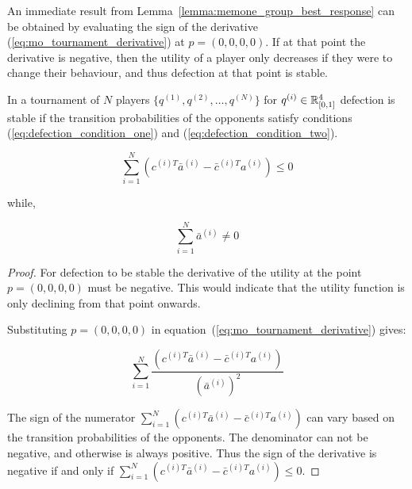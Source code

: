 An immediate result from Lemma~\ref{lemma:memone_group_best_response} can be
obtained by evaluating the sign of the derivative
(\ref{eq:mo_tournament_derivative}) at \(p=(0, 0, 0, 0)\). If at that point the
derivative is negative, then the utility of a player only decreases if they were
to change their behaviour, and thus defection at that point is stable.

\begin{lemma}\label{lemma:stability_of_defection}
    In a tournament of \(N\) players \(\{q^{(1)}, q^{(2)}, \dots, q^{(N)} \}\)
    for \(q^{(i)} \in \mathbb{R}_{[0, 1]} ^ 4\)
    defection is stable if the transition probabilities of the
    opponents satisfy conditions (\ref{eq:defection_condition_one}) and (\ref{eq:defection_condition_two}).

    \begin{equation}\label{eq:defection_condition_one}
        \sum_{i=1} ^ N (c^{(i)T} \bar{a}^{(i)} - \bar{c}^{(i)T} a^{(i)}) \leq 0
    \end{equation}

    while,

    \begin{equation}\label{eq:defection_condition_two}
        \sum_{i=1} ^ N \bar{a}^{(i)} \neq 0
    \end{equation}
\end{lemma}

\begin{proof}
    For defection to be stable the derivative of the utility
    at the point \(p = (0, 0, 0, 0)\) must be negative. This would indicate that
    the utility function is only declining from that point onwards.

    Substituting \(p = (0, 0, 0, 0)\) in
    equation~(\ref{eq:mo_tournament_derivative}) gives:

    \begin{equation}
    \sum_{i=1} ^ N \frac{(c^{(i)T} \bar{a}^{(i)} - \bar{c}^{(i)T} a^{(i)})}
    {(\bar{a}^{(i)})^2}
    \end{equation}

    The sign of the numerator \( \displaystyle\sum_{i=1} ^ N (c^{(i)T} \bar{a}^{(i)} - \bar{c}^{(i)T} a^{(i)})\)
    can vary based on the transition probabilities of the opponents.
    The denominator can not be negative, and otherwise is always positive.
    Thus the sign of the derivative is negative if and only if
    \( \displaystyle\sum_{i=1} ^ N (c^{(i)T} \bar{a}^{(i)} - \bar{c}^{(i)T} a^{(i)}) \leq 0\).
\end{proof}

